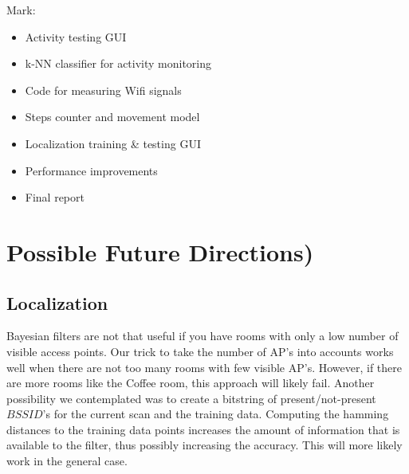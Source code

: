 \documentclass[a4paper,10pt,twoside]{IEEEtran}
\begin{document}
Mark:
\begin{itemize}
    \item Activity testing GUI
    \item k-NN classifier for activity monitoring
    \item Code for measuring Wifi signals
    \item Steps counter and movement model
    \item Localization training \& testing GUI
    \item Performance improvements
    \item Final report
\end{itemize}

\section{Possible Future Directions)}
\label{sec:future-directions}

\subsection{Localization}
Bayesian filters are not that useful if you have rooms with only a low number of visible access points.
Our trick to take the number of AP's into accounts works well when there
are not too many rooms with few visible AP's.
However, if there are more rooms like the Coffee room, this approach will likely fail.
Another possibility we contemplated was to create a bitstring of present/not-present $BSSID$'s for the current scan and the training data.
Computing the hamming distances to the training data points increases the amount of information that
is available to the filter, thus possibly increasing the accuracy.
This will more likely work in the general case.

{}


\end{document}
